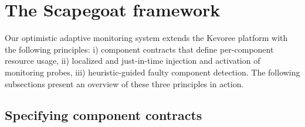 \section{The Scapegoat framework\label{sec:scapegoat-approach}}


Our optimistic adaptive monitoring system extends the Kevoree platform with the following principles: i) component contracts that define per-component resource usage, ii) localized and just-in-time injection and activation of monitoring probes, iii) heuristic-guided faulty component detection. The following subsections present an overview of these three principles in action. 
 



\subsection{Specifying component contracts} \label{componentcontract}

